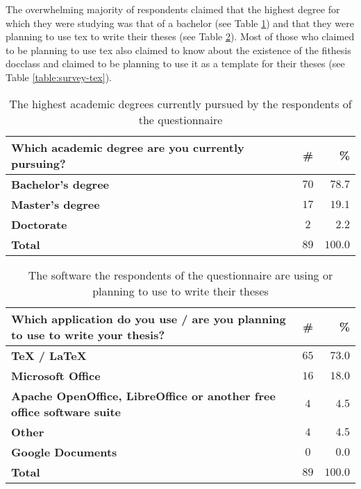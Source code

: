   The overwhelming majority of respondents claimed that the highest degree for which they were studying was that of a bachelor (see Table \ref{table:survey-type}) and that they were planning to use \gls{tex} to write their theses (see Table \ref{table:survey-sw}). Most of those who claimed to be planning to use \gls{tex} also claimed to know about the existence of the fithesis \gls{docclass} and claimed to be planning to use it as a template for their theses (see Table \ref{table:survey-tex}).

  \begin{table}
    \caption{The highest academic degrees currently pursued by the respondents of the questionnaire}
    \begin{tabularx}{\textwidth}{Xcr}
      \textbf{Which academic degree are you currently pursuing?} & \textbf{\#} & \textbf{\%} \\
      \hline
      \textbf{Bachelor's degree}            & $70$          & $78.7$ \\
      \textbf{Master's degree}              & $17$          & $19.1$ \\
      \textbf{Doctorate}                    & $2$           & $2.2$  \\
      \hline
      \textbf{Total}                        & \textbf{$89$} & \textbf{$100.0$}
    \end{tabularx}
    \label{table:survey-type}
  \end{table}

  \begin{table}
    \caption{The software the respondents of the questionnaire are using or planning to use to write their theses}
    \begin{tabularx}{\textwidth}{Xcr}
      \textbf{Which application do you use / are you planning to use to write your thesis?} & \textbf{\#} & \textbf{\%} \\
      \hline
      \textbf{\TeX{} / \LaTeX{}}            & $65$          & $73.0$ \\
      \textbf{Microsoft Office}             & $16$          & $18.0$ \\
      \textbf{Apache OpenOffice, LibreOffice
              or another free office
              software suite}               & $4$           &  $4.5$ \\
      \textbf{Other}                        & $4$           &  $4.5$ \\
      \textbf{Google Documents}             & $0$           &  $0.0$ \\
      \hline
      \textbf{Total}                        & \textbf{$89$} & \textbf{$100.0$}
    \end{tabularx}
    \label{table:survey-sw}
  \end{table}

